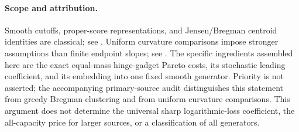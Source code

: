 \paragraph{Scope and attribution.}
Smooth cutoffs, proper-score representations, and Jensen/Bregman
centroid identities are classical; see \cite{banerjee2005,telgarsky2012,p7gneiting2007}.
Uniform curvature comparisons impose stronger assumptions than finite
endpoint slopes; see \cite{ackermann2009}.  The specific ingredients assembled here are the exact equal-mass hinge-gadget Pareto costs, its
stochastic leading coefficient, and its embedding into one fixed smooth
generator.  Priority is not asserted; the accompanying primary-source
audit distinguishes this statement from greedy Bregman clustering and
from uniform curvature comparisons.  This argument does not determine
the universal sharp logarithmic-loss coefficient, the all-capacity
price for larger sources, or a classification of all generators.
